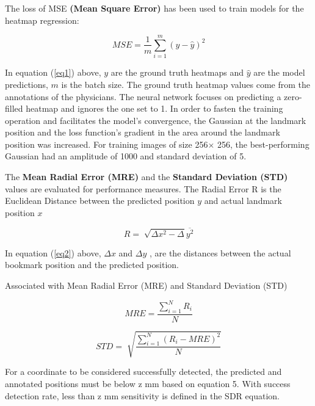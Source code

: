 \documentclass{elektr}
\begin{document}
\tab The loss of MSE \textbf{(Mean Square Error)} has been used to train models for the heatmap regression:



\begin{equation}
	\label{eq1}
	MSE=\frac{1}{m} \sum _{i=1}^{m} \left( y-\hat{y} \right) ^{2}
\end{equation}

In equation (\ref{eq1}) above, \( y \) are the ground truth heatmaps and  \( \hat{y} \)  are the model predictions,  \( m \)  is the batch size. The ground truth heatmap values come from the annotations of the physicians. The neural network focuses on predicting a zero-filled heatmap and ignores the one set to 1. In order to fasten the training operation and facilitates the model’s convergence, the Gaussian at the landmark position and the loss function’s gradient in the area around the landmark position was increased. For training images of size 256$ \times $ 256, the best-performing Gaussian had an amplitude of 1000 and standard deviation of 5. 


The \textbf{Mean Radial Error (MRE)} and the \textbf{Standard Deviation (STD)} values are evaluated for performance measures. The Radial Error R is the Euclidean Distance between the predicted position  \( y \)  and actual landmark position  \( x \) 


\begin{equation}
	\label{eq2}
	R=\sqrt[]{ \Delta x^{2}- \Delta }\overline{y^{2}}
\end{equation}

\tab In equation (\ref{eq2}) above, \(  \Delta x \)  and  \(  \Delta y \) , are the distances between the actual bookmark position and the predicted position. 


\tab Associated with Mean Radial Error (MRE) and Standard Deviation (STD)

\begin{equation}
	\label{eq3}
	MRE=\frac{ \sum _{i=1}^{N}R_{i}}{N}
\end{equation}

\begin{equation}
	\label{eq4}
	STD=\sqrt[]{\frac{ \sum _{i=1}^{N} \left( R_{i}-MRE \right) ^{2}}{N}}
\end{equation}

\tab For a coordinate to be considered successfully detected, the predicted and annotated positions must be below z mm based on equation 5. With success detection rate, less than z mm sensitivity is defined in the SDR equation.
\end{document}
